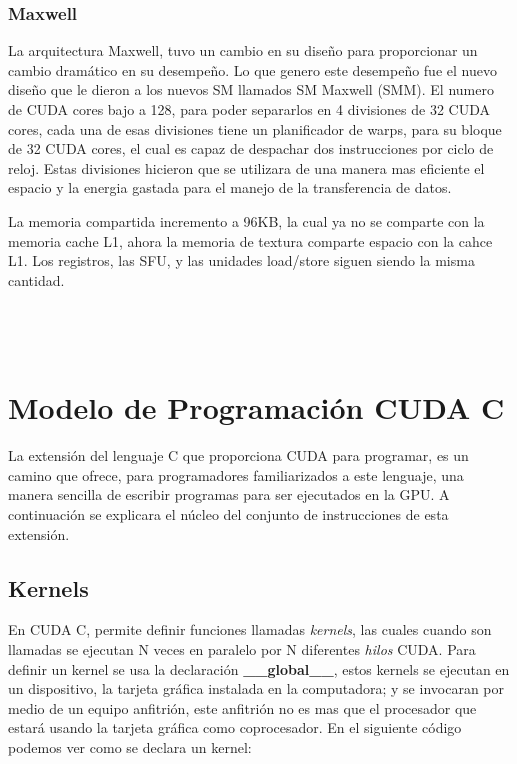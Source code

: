 \subsubsection{Maxwell}
La arquitectura Maxwell\cite{Maxwell}, tuvo un cambio en su diseño para proporcionar un cambio dramático en su desempeño. Lo que genero este desempeño fue el nuevo diseño que le dieron a los nuevos SM llamados SM Maxwell (SMM). El numero de CUDA cores bajo a 128, para poder separarlos en 4 divisiones de 32 CUDA cores, cada una de esas divisiones tiene un planificador de warps, para su bloque de 32 CUDA cores, el cual es capaz de despachar dos instrucciones por ciclo de reloj. Estas divisiones hicieron que se utilizara de una manera mas eficiente el espacio y la energia gastada para el manejo de la transferencia de datos.

La memoria compartida incremento a 96KB, la cual ya no se comparte con la memoria cache L1, ahora la memoria de textura comparte espacio con la cahce L1. Los registros, las SFU, y las unidades load/store siguen siendo la misma cantidad.\\\\\\\



\pagebreak
\section{Modelo de Programación CUDA C}
La extensión del lenguaje C que proporciona CUDA para programar, es un camino que ofrece, para programadores familiarizados a este lenguaje, una manera sencilla de escribir programas para ser ejecutados en la GPU. A continuación se explicara el núcleo del conjunto de instrucciones de esta extensión.
\subsection{Kernels}

En CUDA C, permite definir funciones llamadas \textit{kernels}, las cuales cuando son llamadas se ejecutan N veces en paralelo por N diferentes \textit{hilos} CUDA. Para definir un kernel se usa la declaración \textbf{\_\_global\_\_}, estos kernels se ejecutan en un dispositivo, la tarjeta gráfica instalada en la computadora; y se invocaran por medio de un equipo anfitrión, este anfitrión no es mas que el procesador que estará usando la tarjeta gráfica como coprocesador. En el siguiente código podemos ver como se declara un kernel: 

